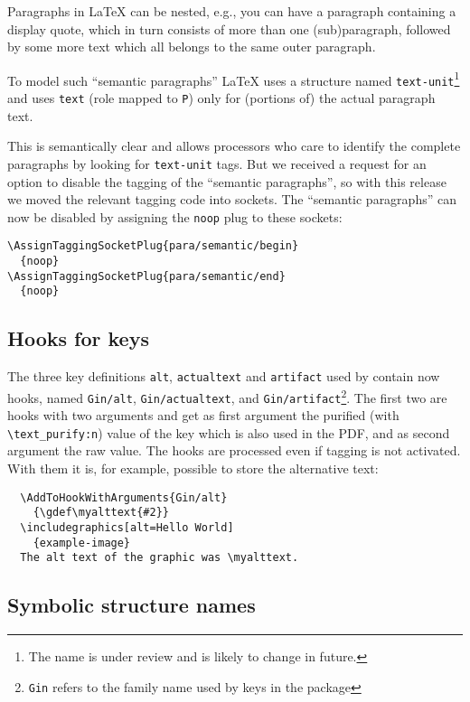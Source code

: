 \documentclass{ltnews}
\begin{document}
Paragraphs in \LaTeX{} can be nested, e.g., you can have a paragraph
containing a display quote, which in turn consists of more than one
(sub)paragraph, followed by some more text which all belongs to the
same outer paragraph.

To model such \enquote{semantic paragraphs} \LaTeX{} uses a structure
named \texttt{text-unit}\footnote{The name is under review and is
likely to change in future.}  and uses \texttt{text} (role mapped to
\texttt{P}) only for (portions of) the actual paragraph text.

This is semantically clear and allows processors who care to identify
the complete paragraphs by looking for \texttt{text-unit} tags.  But
we received a request for an option to disable the tagging of the
\enquote{semantic paragraphs}, so with this release we moved the
relevant tagging code into sockets. The \enquote{semantic paragraphs}
can now be disabled by assigning the \texttt{noop} plug to these
sockets:
\begin{verbatim}
\AssignTaggingSocketPlug{para/semantic/begin}
  {noop}
\AssignTaggingSocketPlug{para/semantic/end}
  {noop}
\end{verbatim}

\subsection{Hooks for  keys}

The three key definitions \texttt{alt}, \texttt{actualtext} and
\texttt{artifact} used by  contain now hooks,
named \texttt{Gin/alt}, \texttt{Gin/actualtext}, and
\texttt{Gin/artifact}\footnote{\texttt{Gin} refers to the family name
used by keys in the  package}.  The first two are hooks
with two arguments and get as first argument the purified (with
\verb+\text_purify:n+) value of the key which is also used in
the PDF, and as second argument the raw value.  The hooks are processed
even if tagging is not activated.  With them it is, for example,
possible to store the alternative text:
\begin{verbatim}
  \AddToHookWithArguments{Gin/alt}
    {\gdef\myalttext{#2}}
  \includegraphics[alt=Hello World]
    {example-image}
  The alt text of the graphic was \myalttext.
\end{verbatim}


\subsection{Symbolic structure names}
\end{document}
